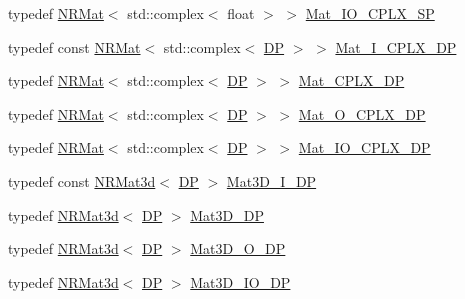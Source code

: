 \begin{DoxyCompactItemize}
\item 
typedef \mbox{\hyperlink{classNR_1_1NRMat}{N\+R\+Mat}}$<$ std\+::complex$<$ float $>$ $>$ \mbox{\hyperlink{namespaceNR_a4e456bc4660685058fb8a3f9e73220ef}{Mat\+\_\+\+I\+O\+\_\+\+C\+P\+L\+X\+\_\+\+SP}}
\item 
typedef const \mbox{\hyperlink{classNR_1_1NRMat}{N\+R\+Mat}}$<$ std\+::complex$<$ \mbox{\hyperlink{namespaceNR_af6ff762dd605ff477b8e52387253a02a}{DP}} $>$ $>$ \mbox{\hyperlink{namespaceNR_ac71d287c73aca6bd25aef6debf83db29}{Mat\+\_\+\+I\+\_\+\+C\+P\+L\+X\+\_\+\+DP}}
\item 
typedef \mbox{\hyperlink{classNR_1_1NRMat}{N\+R\+Mat}}$<$ std\+::complex$<$ \mbox{\hyperlink{namespaceNR_af6ff762dd605ff477b8e52387253a02a}{DP}} $>$ $>$ \mbox{\hyperlink{namespaceNR_a83c1447a6eed5061ad16601934856a19}{Mat\+\_\+\+C\+P\+L\+X\+\_\+\+DP}}
\item 
typedef \mbox{\hyperlink{classNR_1_1NRMat}{N\+R\+Mat}}$<$ std\+::complex$<$ \mbox{\hyperlink{namespaceNR_af6ff762dd605ff477b8e52387253a02a}{DP}} $>$ $>$ \mbox{\hyperlink{namespaceNR_afb08c6dc458497ae43e0905f29e1e752}{Mat\+\_\+\+O\+\_\+\+C\+P\+L\+X\+\_\+\+DP}}
\item 
typedef \mbox{\hyperlink{classNR_1_1NRMat}{N\+R\+Mat}}$<$ std\+::complex$<$ \mbox{\hyperlink{namespaceNR_af6ff762dd605ff477b8e52387253a02a}{DP}} $>$ $>$ \mbox{\hyperlink{namespaceNR_a8a17341866e8608bfddf21602c8b9f89}{Mat\+\_\+\+I\+O\+\_\+\+C\+P\+L\+X\+\_\+\+DP}}
\item 
typedef const \mbox{\hyperlink{classNR_1_1NRMat3d}{N\+R\+Mat3d}}$<$ \mbox{\hyperlink{namespaceNR_af6ff762dd605ff477b8e52387253a02a}{DP}} $>$ \mbox{\hyperlink{namespaceNR_a3cb7a4c8eb0a2a98a239a9a8200ec5d8}{Mat3\+D\+\_\+\+I\+\_\+\+DP}}
\item 
typedef \mbox{\hyperlink{classNR_1_1NRMat3d}{N\+R\+Mat3d}}$<$ \mbox{\hyperlink{namespaceNR_af6ff762dd605ff477b8e52387253a02a}{DP}} $>$ \mbox{\hyperlink{namespaceNR_a64c9c5cd3e465fce99c1068a62bbc9d3}{Mat3\+D\+\_\+\+DP}}
\item 
typedef \mbox{\hyperlink{classNR_1_1NRMat3d}{N\+R\+Mat3d}}$<$ \mbox{\hyperlink{namespaceNR_af6ff762dd605ff477b8e52387253a02a}{DP}} $>$ \mbox{\hyperlink{namespaceNR_a74d09ea99e0452b529d2eb055cb09108}{Mat3\+D\+\_\+\+O\+\_\+\+DP}}
\item 
typedef \mbox{\hyperlink{classNR_1_1NRMat3d}{N\+R\+Mat3d}}$<$ \mbox{\hyperlink{namespaceNR_af6ff762dd605ff477b8e52387253a02a}{DP}} $>$ \mbox{\hyperlink{namespaceNR_ae2c061d1bcce9ea856c905d761956d76}{Mat3\+D\+\_\+\+I\+O\+\_\+\+DP}}
\item 

\end{DoxyCompactItemize}
